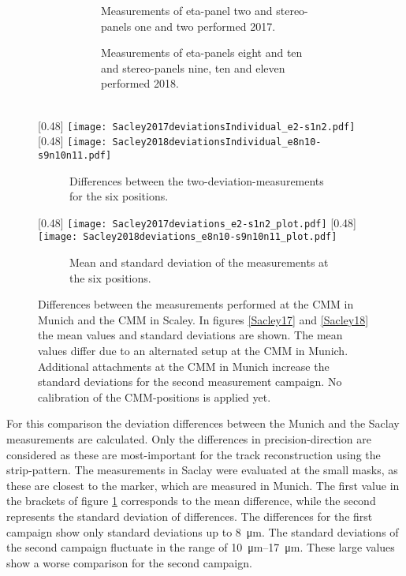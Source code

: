 \documentclass[
twoside,            %
BCOR1.4cm,          %
10pt,               %
headings=normal,    %
headsepline,        %
clearplainpage,		%
final,              %
div=14,
open=right,
bibliography=toc
]{scrreprt}
\begin{document}
\begin{figure}[!h]
	\centering
	\begin{subfigure}[b]{\textwidth}
		\begin{subfigure}[b]{0.45\textwidth}
			Measurements of eta-panel two and stereo-panels one and two performed 2017.
		\end{subfigure}
		\hfill
		\begin{subfigure}[b]{0.45\textwidth}
			Measurements of eta-panels eight and ten and stereo-panels nine, ten and eleven performed 2018.
		\end{subfigure}
	\end{subfigure}
	\vspace{1mm}
	\\
	\subcaptionbox{
		\label{Sacley2017deviationsIndividual_e2-s1n2} 
	}
	[0.48\textwidth]
	{\texttt{[image: Sacley2017deviationsIndividual\_e2-s1n2.pdf]}}
	\hfill
	\subcaptionbox{
		\label{Sacley2018deviationsIndividual_e8n10-s9n10n11} 
	}
	[0.48\textwidth]
	{\texttt{[image: Sacley2018deviationsIndividual\_e8n10-s9n10n11.pdf]}}
	\begin{subfigure}[b]{\textwidth}
		\centering
		Differences between the two-deviation-measurements for the six positions.
	\end{subfigure}
	\hfill
	\subcaptionbox{
		\label{Sacley17} 
	}
	[0.48\textwidth]
	{\texttt{[image: Sacley2017deviations\_e2-s1n2\_plot.pdf]}}
	\hfill
	\subcaptionbox{
		\label{Sacley18} 
	}
	[0.48\textwidth]
	{\texttt{[image: Sacley2018deviations\_e8n10-s9n10n11\_plot.pdf]}}
	\begin{subfigure}[b]{\textwidth}
		\centering
		Mean and standard deviation of the measurements at the six positions.
	\end{subfigure}
	\vspace{-2mm}
	\caption{
		Differences between the measurements performed at the CMM in Munich and the CMM in Scaley.
		In figures \ref{Sacley17} and \ref{Sacley18} the mean values and standard deviations are shown.
		The mean values differ due to an alternated setup at the CMM in Munich.
		Additional attachments at the CMM in Munich increase the standard deviations for the second measurement campaign.
		No calibration of the CMM-positions is applied yet.
	}
	\label{SacleyComparisonMarker}
\end{figure}

For this comparison the deviation differences between the Munich and the Saclay measurements are calculated.
Only the differences in precision-direction are considered as these are most-important for the track reconstruction using the strip-pattern.
The measurements in Saclay were evaluated at the small masks, as these are closest to the marker, which are measured in Munich.
The first value in the brackets of figure \ref{SacleyComparisonMarker} corresponds to the mean difference, while the second represents the standard deviation of differences.
The differences for the first campaign show only standard deviations up to \SI{8}{\micro\m}.
The standard deviations of the second campaign fluctuate in the range of \SIrange{10}{17}{\micro\m}.
These large values show a worse comparison for the second campaign.
\end{document}
